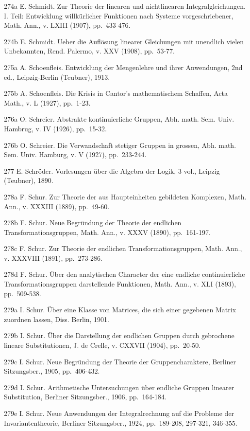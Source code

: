 274a E. Schmidt. Zur Theorie der linearen und nichtlinearen Integralgleichungen. I. Teil: Entwicklung willkürlicher Funktionen nach Systeme vorgeschriebener, Math. Ann., v. LXIII (1907), pp.~433-476.

274b E. Schmidt. Ueber die Auflösung linearer Gleichungen mit unendlich vielen Unbekannten, Rend. Palermo, v. XXV (1908), pp.~53-77.

275a A. Schoenfleis. Entwicklung der Mengenlehre und ihrer Anwendungen, 2nd ed., Leipzig-Berlin (Teubner), 1913.

275b A. Schoenfleis. Die Krisis in Cantor's mathematischem Schaffen, Acta Math., v. L (1927), pp.~1-23.

276a O. Schreier. Abstrakte kontinuierliche Gruppen, Abh. math. Sem. Univ. Hambrug, v. IV (1926), pp.~15-32.

276b O. Schreier. Die Verwandschaft stetiger Gruppen in grossen, Abh. math. Sem. Univ. Hamburg, v. V (1927), pp.~233-244.

277 E. Schröder. Vorlesungen über die Algebra der Logik, 3 vol., Leipzig (Teubner), 1890.

278a F. Schur. Zur Theorie der aus Haupteinheiten gebildeten Komplexen, Math. Ann., v. XXXIII (1889), pp.~49-60.

278b F. Schur. Neue Begründung der Theorie der endlichen Transformationsgruppen, Math. Ann., v. XXXV (1890), pp.~161-197.

278c F. Schur. Zur Theorie der endlichen Transformationsgruppen, Math. Ann., v. XXXVIII (1891), pp.~273-286.

278d F. Schur. Über den analytischen Character der eine endliche continuierliche Transformationsgruppen darstellende Funktionen, Math. Ann., v. XLI (1893), pp.~509-538.

279a I. Schur. Über eine Klasse von Matrices, die sich einer gegebenen Matrix zuordnen lassen, Diss. Berlin, 1901.

279b I. Schur. Über die Darstellung der endlichen Gruppen durch gebrochene lineare Substitutionen, J. de Crelle, v. CXXVII (1904), pp.~20-50.

279c I. Schur. Neue Begründung der Theorie der Gruppencharaktere, Berliner Sitzungsber., 1905, pp.~406-432.

279d I. Schur. Arithmetische Untersuchungen über endliche Gruppen linearer Substitution, Berliner Sitzungsber., 1906, pp.~164-184.

279e I. Schur. Neue Anwendungen der Integralrechnung auf die Probleme der Invariantentheorie, Berliner Sitzungsber., 1924, pp.~189-208, 297-321, 346-355.

